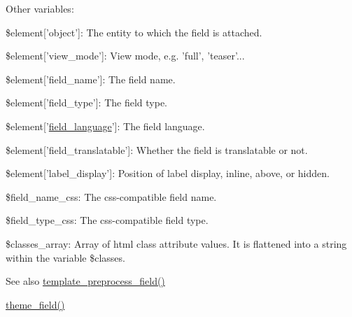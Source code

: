 Other variables:
\begin{DoxyItemize}
\item \$element\mbox{[}'object'\mbox{]}: The entity to which the field is attached.
\item \$element\mbox{[}'view\_\-mode'\mbox{]}: View mode, e.g. 'full', 'teaser'...
\item \$element\mbox{[}'field\_\-name'\mbox{]}: The field name.
\item \$element\mbox{[}'field\_\-type'\mbox{]}: The field type.
\item \$element\mbox{[}'\hyperlink{group__field__language_gaff79088cd3951d2127adad1a2c13ad3e}{field\_\-language}'\mbox{]}: The field language.
\item \$element\mbox{[}'field\_\-translatable'\mbox{]}: Whether the field is translatable or not.
\item \$element\mbox{[}'label\_\-display'\mbox{]}: Position of label display, inline, above, or hidden.
\item \$field\_\-name\_\-css: The css-\/compatible field name.
\item \$field\_\-type\_\-css: The css-\/compatible field type.
\item \$classes\_\-array: Array of html class attribute values. It is flattened into a string within the variable \$classes.
\end{DoxyItemize}

\begin{DoxySeeAlso}{See also}
\hyperlink{group__field_ga6dc60d3c482230f380dd3b112487d717}{template\_\-preprocess\_\-field()} 

\hyperlink{group__themeable_gaee35966f09683ab054aef8f6fd022d2c}{theme\_\-field()} 
\end{DoxySeeAlso}
